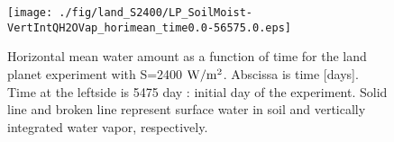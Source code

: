 \documentclass[dvipdfmx,twocolumn,10pt]{jsarticle}
\begin{document}
\begin{figure}[h]
  \centering
  \texttt{[image: ./fig/land\_S2400/LP\_SoilMoist-VertIntQH2OVap\_horimean\_time0.0-56575.0.eps]}
  \caption{
Horizontal mean water amount as a function of time for the land planet experiment with S=2400 $\rm{W/m^{2}}$. 
Abscissa is time [days]. 
Time at the leftside is 5475 day : initial day of the experiment. 
Solid line and broken line represent surface water in soil and vertically integrated water vapor, respectively. 
}
  \label{timeseries}
\end{figure}
\end{document}
